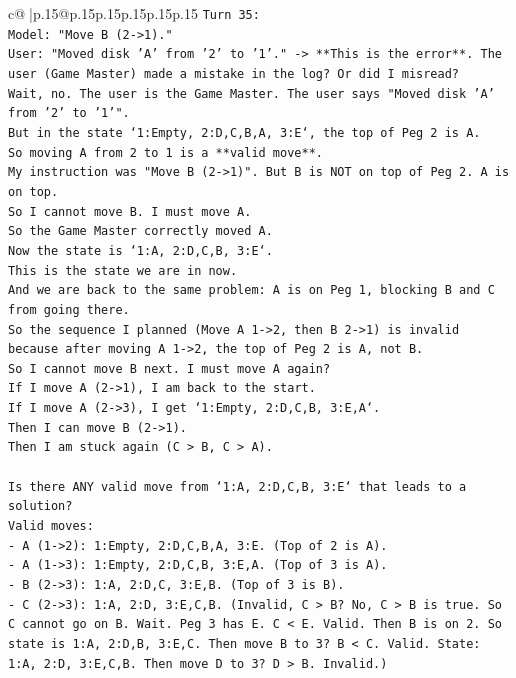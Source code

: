\documentclass{article}
\begin{document}
{\begin{supertabular}{c@{$\;$}|p{.15\linewidth}@{}p{.15\linewidth}p{.15\linewidth}p{.15\linewidth}p{.15\linewidth}p{.15\linewidth}}
{{{\texttt{Turn 35:} \\
\texttt{Model: "Move B (2{-}>1)."} \\
\texttt{User: "Moved disk 'A' from '2' to '1'." {-}> **This is the error**. The user (Game Master) made a mistake in the log? Or did I misread?} \\
\texttt{Wait, no. The user is the Game Master. The user says "Moved disk 'A' from '2' to '1'".} \\
\texttt{But in the state `1:Empty, 2:D,C,B,A, 3:E`, the top of Peg 2 is A.} \\
\texttt{So moving A from 2 to 1 is a **valid move**.} \\
\texttt{My instruction was "Move B (2{-}>1)". But B is NOT on top of Peg 2. A is on top.} \\
\texttt{So I cannot move B. I must move A.} \\
\texttt{So the Game Master correctly moved A.} \\
\texttt{Now the state is `1:A, 2:D,C,B, 3:E`.} \\
\texttt{This is the state we are in now.} \\
\texttt{And we are back to the same problem: A is on Peg 1, blocking B and C from going there.} \\
\texttt{So the sequence I planned (Move A 1{-}>2, then B 2{-}>1) is invalid because after moving A 1{-}>2, the top of Peg 2 is A, not B.} \\
\texttt{So I cannot move B next. I must move A again?} \\
\texttt{If I move A (2{-}>1), I am back to the start.} \\
\texttt{If I move A (2{-}>3), I get `1:Empty, 2:D,C,B, 3:E,A`.} \\
\texttt{Then I can move B (2{-}>1).} \\
\texttt{Then I am stuck again (C > B, C > A).} \\
\\ 
\texttt{Is there ANY valid move from `1:A, 2:D,C,B, 3:E` that leads to a solution?} \\
\texttt{Valid moves:} \\
\texttt{{-} A (1{-}>2): 1:Empty, 2:D,C,B,A, 3:E. (Top of 2 is A).} \\
\texttt{{-} A (1{-}>3): 1:Empty, 2:D,C,B, 3:E,A. (Top of 3 is A).} \\
\texttt{{-} B (2{-}>3): 1:A, 2:D,C, 3:E,B. (Top of 3 is B).} \\
\texttt{{-} C (2{-}>3): 1:A, 2:D, 3:E,C,B. (Invalid, C > B? No, C > B is true. So C cannot go on B. Wait. Peg 3 has E. C < E. Valid. Then B is on 2. So state is 1:A, 2:D,B, 3:E,C. Then move B to 3? B < C. Valid. State: 1:A, 2:D, 3:E,C,B. Then move D to 3? D > B. Invalid.)} \\
}}}
\end{supertabular}}
\end{document}
